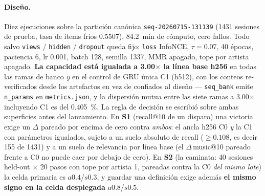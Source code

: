 \documentclass[11pt]{article}
\newcommand{\dsid}[1]{\texttt{\small #1}}
\begin{document}
\paragraph{Diseño.} Diez ejecuciones sobre la partición canónica
\dsid{seq-20260715-131139} (\num{1431} sesiones de prueba, tasa de ítems fríos
\num{0.5507}), \SI{84.2}{\minute} de cómputo, cero fallos. Todo salvo
\texttt{views} / \texttt{hidden} / \texttt{dropout} queda fijo: \texttt{loss}
InfoNCE, $\tau=\num{0.07}$, \num{40} épocas, paciencia \num{6}, lr \num{0.001},
batch \num{128}, semilla \num{1337}, MMR apagado, tope por artista apagado.
\textbf{La capacidad está igualada a \num{3.00}$\times$ la línea base h256} en
todas las ramas de banco \emph{y} en el control de GRU única C1 (h512), con los
conteos re-verificados desde los artefactos en vez de confiados al diseño ---
\texttt{seq\_bank} emite \texttt{n\_params} en \texttt{metrics.json}, y la
dispersión mutua entre las siete ramas a \num{3.00}$\times$ incluyendo C1 es del
\SI{0.405}{\percent}. La regla de decisión se escribió sobre ambas superficies
antes del lanzamiento. En \textbf{S1} (recall@10 de un disparo) una victoria exige
un $\Delta$ pareado por encima de cero contra \emph{ambos}: el ancla h256 C0
\emph{y} la C1 con parámetros igualados, sujeto a un suelo absoluto de recall
($\ge\num{0.108}$, es decir \num{155} de \num{1431}) y a un suelo de relevancia
por línea base (el $\Delta$\,music@10 pareado frente a C0 no puede caer por debajo
de cero). En \textbf{S2} (la caminata: \num{40} sesiones held-out $\times$
\num{20} pasos con tope por artista 1, pareadas contra la C0 \emph{del mismo
lote}) la celda primaria es $a\num{0.4}$/$s\num{0.3}$, y guardar una definición
exige además \textbf{el mismo signo en la celda desplegada}
$a\num{0.8}$/$s\num{0.5}$.
\end{document}
